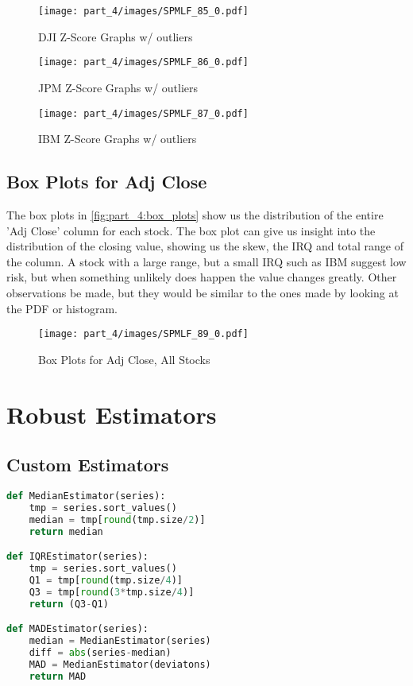 \begin{figure}[!htb]
    \centering
    \texttt{[image: part\_4/images/SPMLF\_85\_0.pdf]}
    \caption{DJI Z-Score Graphs w/ outliers}
    \label{fig:part_4:z_score_dji_out}
\end{figure}

\begin{figure}[!htb]
    \centering
    \texttt{[image: part\_4/images/SPMLF\_86\_0.pdf]}
    \caption{JPM Z-Score Graphs w/ outliers}
    \label{fig:part_4:z_score_jpm_out}
\end{figure}

\begin{figure}[!htb]
    \centering
    \texttt{[image: part\_4/images/SPMLF\_87\_0.pdf]}
    \caption{IBM Z-Score Graphs w/ outliers}
    \label{fig:part_4:z_score_ibm_out}
\end{figure}

\subsection{Box Plots for Adj Close}

The box plots in \autoref{fig:part_4:box_plots} show us the distribution of the entire 'Adj Close' column for each stock. The box plot can give us insight into the distribution of the closing value, showing us the skew, the IRQ and total range of the column. A stock with a large range, but a small IRQ such as IBM suggest low risk, but when something unlikely does happen the value changes greatly. Other observations be made, but they would be similar to the ones made by looking at the PDF or histogram.

\begin{figure}[!htb]
    \centering
    \texttt{[image: part\_4/images/SPMLF\_89\_0.pdf]}
    \caption{Box Plots for Adj Close, All Stocks}
    \label{fig:part_4:box_plots}
\end{figure}

\section{Robust Estimators}

\subsection{Custom Estimators}

\begin{lstlisting}[caption={Custom Python Estimators},captionpos=b,language=Python]
def MedianEstimator(series):
    tmp = series.sort_values()
    median = tmp[round(tmp.size/2)]
    return median

def IQREstimator(series):
    tmp = series.sort_values()
    Q1 = tmp[round(tmp.size/4)]
    Q3 = tmp[round(3*tmp.size/4)]
    return (Q3-Q1)

def MADEstimator(series):
    median = MedianEstimator(series)
    diff = abs(series-median)
    MAD = MedianEstimator(deviatons)
    return MAD
\end{lstlisting}

